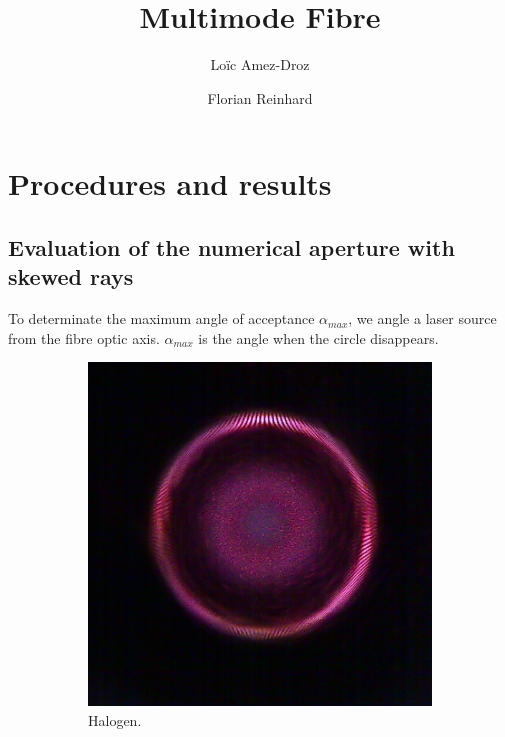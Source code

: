\documentclass[a4paper, 12pt]{paper}
\author{Loïc Amez-Droz \and Florian Reinhard}
\title{Multimode Fibre}
\begin{document}

\section{Procedures and results}
\subsection{Evaluation of the numerical aperture with skewed rays}

To determinate the maximum angle of acceptance $\alpha_{max}$, we angle a laser source from the fibre optic axis.
$\alpha_{max}$ is the angle when the circle disappears.

\begin{figure}[H]
    \centering
    \begin{subfigure}[b]{0.45\textwidth}
        \includegraphics[width=\textwidth]{img/25_deg}
        \caption{Halogen.}
    \end{subfigure}
    \begin{subfigure}[b]{0.45\textwidth}

\end{subfigure}
\end{figure}
\end{document}
